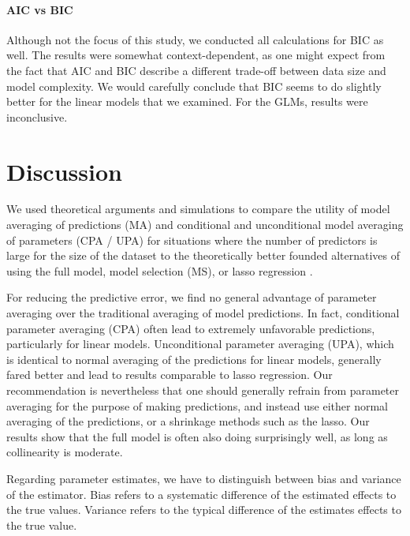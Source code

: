 \documentclass[5p]{elsarticle}
\begin{document}
\paragraph{AIC vs BIC}

Although not the focus of this study, we conducted all calculations for BIC as well. The results were somewhat context-dependent, as one might expect from the fact that AIC and BIC describe a different trade-off between data size and model complexity. We would carefully conclude that BIC seems to do slightly better for the linear models that we examined. For the GLMs, results were inconclusive. 


\section{Discussion}

We used theoretical arguments and simulations to compare the utility of model averaging of predictions (MA) and conditional and unconditional model averaging of parameters (CPA / UPA) for situations where the number of predictors is large for the size of the dataset to the theoretically better founded alternatives of using the full model, model selection (MS), or lasso regression . 

For reducing the predictive error, we find no general advantage of parameter averaging over the traditional averaging of model predictions. In fact, conditional parameter averaging (CPA) often lead to extremely unfavorable predictions, particularly for linear models. Unconditional parameter averaging (UPA), which is identical to normal averaging of the predictions for linear models, generally fared better and lead to results comparable to lasso regression. Our recommendation is nevertheless that one should generally refrain from parameter averaging for the purpose of making predictions, and instead use either normal averaging of the predictions, or a shrinkage methods such as the lasso. Our results show that the full model is often also doing surprisingly well, as long as collinearity is moderate. 

Regarding parameter estimates, we have to distinguish between bias and variance of the estimator. Bias refers to a systematic difference of the estimated effects to the true values. Variance refers to the typical difference of the estimates effects to the true value. 
\end{document}
